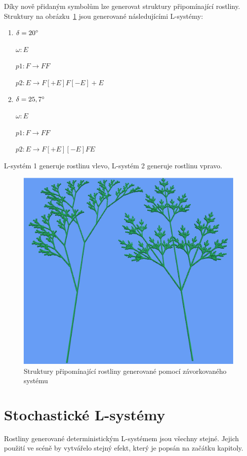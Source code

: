 \documentclass[thesis=M,czech]{FITthesis}[2019/12/23]
\begin{document}
Díky nově přidaným symbolům lze generovat struktury připomínající rostliny. Struktury na obrázku~\ref{fig:plant_like_str} jsou generované následujícími L-systémy:

\begin{enumerate}
\item $\delta = 20\degree$

	$\omega: E$
	
	$p1: F \rightarrow FF$
	
	$p2: E \rightarrow F[+E]F[-E]+E$
	
\item $\delta = 25,7\degree$

	$\omega: E$
	
	$p1: F \rightarrow FF$
	
	$p2: E \rightarrow F[+E][-E]FE$

\end{enumerate}

L-systém 1 generuje rostlinu vlevo, L-systém 2 generuje rostlinu vpravo.

\begin{figure}\centering
	\includegraphics[width=\textwidth]{images/plant_d_e}
	\caption[Struktury připomínající rostliny]{Struktury připomínající rostliny generované pomocí závorkovaného systému}\label{fig:plant_like_str}
\end{figure}

\section{Stochastické L-systémy}
Rostliny generované deterministickým L-systémem jsou všechny stejné. Jejich použití ve scéně by vytvářelo stejný efekt, který je popsán na začátku kapitoly. 
\end{document}
